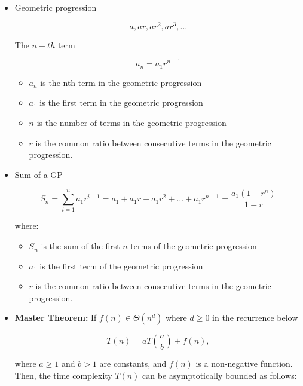 \documentclass{article}
\begin{document}
\begin{enumerate}
\begin{itemize}
    \item Geometric progression
    
    \begin{equation*}
        a, ar, ar^2, ar^3,...
    \end{equation*}

    The $n-th$ term

    \begin{equation*}
        a_n = a_1 r^{n-1}
    \end{equation*}

    \begin{itemize}
        \item $a_n$ is the nth term in the geometric progression
        \item $a_1$ is the first term in the geometric progression
        \item $n$ is the number of terms in the geometric progression
        \item $r$ is the common ratio between consecutive terms in the geometric progression.    
    \end{itemize}
    
    \item Sum of a GP
    
    \begin{equation*}
        S_n = \sum^{n}_{i=1} a_1r^{i-1} = a_1 + a_1r + a_1r^2 + ... + a_1r^{n-1} =  \frac{a_1(1-r^n)}{1-r}    
    \end{equation*}
        
        where:
        
    \begin{itemize}
        \item $S_n$ is the sum of the first $n$ terms of the geometric progression
        \item $a_1$ is the first term of the geometric progression
        \item $r$ is the common ratio between consecutive terms in the geometric progression.
    \end{itemize}

    \item \textbf{Master Theorem:} If $f(n) \in \Theta(n^d)$ where $d\geq0$ in the recurrence below  

    \begin{equation*}
    T(n) = a T(\frac{n}{b}) + f(n),
    \end{equation*}

    
    where $a \geq 1$ and $b > 1$ are constants, and $f(n)$ is a non-negative function. Then, the time complexity $T(n)$ can be asymptotically bounded as follows:
    

\end{itemize}
\end{enumerate}
\end{document}
